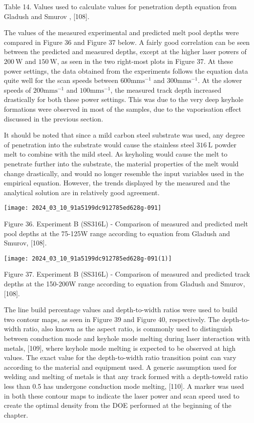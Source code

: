 \documentclass[10pt]{article}
\begin{document}
Table 14. Values used to calculate values for penetration depth equation from Gladush and Smurov , [108].

The values of the measured experimental and predicted melt pool depths were compared in Figure 36 and Figure 37 below. A fairly good correlation can be seen between the predicted and measured depths, except at the higher laser powers of $200 \mathrm{~W}$ and $150 \mathrm{~W}$, as seen in the two right-most plots in Figure 37. At these power settings, the data obtained from the experiments follows the equation data quite well for the scan speeds between $600 \mathrm{mms}^{-1}$ and $300 \mathrm{mms}^{-1}$. At the slower speeds of $200 \mathrm{mms}^{-1}$ and $100 \mathrm{mms}^{-1}$, the measured track depth increased drastically for both these power settings. This was due to the very deep keyhole formations were observed in most of the samples, due to the vaporisation effect discussed in the previous section.

It should be noted that since a mild carbon steel substrate was used, any degree of penetration into the substrate would cause the stainless steel $316 \mathrm{~L}$ powder melt to combine with the mild steel. As keyholing would cause the melt to penetrate further into the substrate, the material properties of the melt would change drastically, and would no longer resemble the input variables used in the empirical equation. However, the trends displayed by the measured and the analytical solution are in relatively good agreement.

\begin{center}
\texttt{[image: 2024\_03\_10\_91a5199dc912785ed628g-091]}
\end{center}

Figure 36. Experiment B (SS316L) - Comparison of measured and predicted melt pool depths at the 75-125W range according to equation from Gladush and Smurov, [108].

\begin{center}
\texttt{[image: 2024\_03\_10\_91a5199dc912785ed628g-091(1)]}
\end{center}

Figure 37. Experiment B (SS316L) - Comparison of measured and predicted track depths at the 150-200W range according to equation from Gladush and Smurov, [108].

The line build percentage values and depth-to-width ratios were used to build two contour maps, as seen in Figure 39 and Figure 40, respectively. The depth-to-width ratio, also known as the aspect ratio, is commonly used to distinguish between conduction mode and keyhole mode melting during laser interaction with metals, [109], where keyhole mode melting is expected to be observed at high values. The exact value for the depth-to-width ratio transition point can vary according to the material and equipment used. A generic assumption used for welding and melting of metals is that any track formed with a depth-toweld ratio less than 0.5 has undergone conduction mode melting, [110]. A marker was used in both these contour maps to indicate the laser power and scan speed used to create the optimal density from the DOE performed at the beginning of the chapter.
\end{document}

